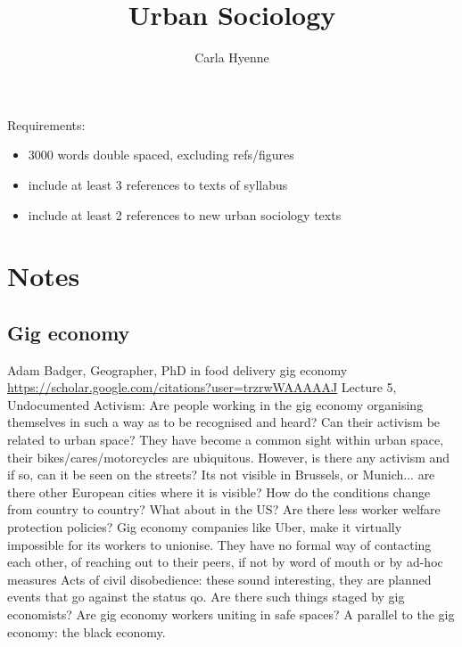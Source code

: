 \documentclass{article}
\title{Urban Sociology}
\author{Carla Hyenne }
\begin{document}
\maketitle

Requirements:
\begin{itemize}
	\item 3000 words double spaced, excluding refs/figures
	\item include at least 3 references to texts of syllabus
	\item include at least 2 references to new urban sociology texts
\end{itemize}


\section{Notes}

\subsection{Gig economy}

\begin{outline}
	\1 Adam Badger, Geographer, PhD in food delivery gig economy  \url{https://scholar.google.com/citations?user=trzrwWAAAAAJ}
	\1 Lecture 5, Undocumented Activism: 
		\2 Are people working in the gig economy organising themselves in such a way as to be recognised and heard?
		\2 Can their activism be related to urban space? They have become a common sight within urban space, their bikes/cares/motorcycles are ubiquitous. However, is there any activism and if so, can it be seen on the streets? Its not visible in Brussels, or Munich... are there other European cities where it is visible? How do the conditions change from country to country? What about in the US? Are there less worker welfare protection policies?
		\2 Gig economy companies like Uber, make it virtually impossible for its workers to unionise. They have no formal way of contacting each other, of reaching out to their peers, if not by word of mouth or by ad-hoc measures
		\2 Acts of civil disobedience: these sound interesting, they are planned events that go against the status qo. Are there such things staged by gig economists?
		\2 Are gig economy workers uniting in safe spaces?
	\1 A parallel to the gig economy: the black economy. 
\end{outline}
\end{document}
